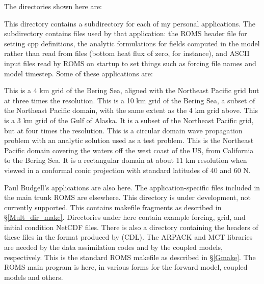 The directories shown here are:
\begin{klist}
   This directory contains a subdirectory for each of my
  personal applications. The subdirectory contains files used by that
  application: the ROMS header file for setting cpp definitions, the
  analytic formulations for fields computed in the model rather than
  read from files (bottom heat flux of zero, for instance), and ASCII
  input files read by ROMS on startup to set things such as forcing file
  names and model timestep. Some of these applications are:
\begin{klist}
   This is a 4 km grid of the Bering Sea, aligned with
  the Northeast Pacific grid but at three times the resolution.
   This is a 10 km grid of the Bering Sea, a
  subset of the Northeast Pacific domain, with the same extent as
  the 4 km grid above.
   This is a 3 km grid of the Gulf of Alaska. It is a
  subset of the Northeast Pacific grid, but at four times the
  resolution.
   This is a circular domain wave propagation problem
  with an analytic solution used as a test problem.
   This is the Northeast Pacific domain covering the
  waters off the west coast of the US, from California to the Bering
  Sea. It is a rectangular domain at about 11 km resolution when
  viewed in a conformal conic projection with standard latitudes of
  40 and 60 N.
\end{klist}
  Paul Budgell's applications are also here. The application-specific
  files included in the main trunk ROMS are elsewhere.
   This directory is under development, not
  currently supported.
   This contains makefile fragments as described in
  \S\ref{Mult_dir_make}.
   Directories under here contain example forcing, grid,
  and initial condition NetCDF files. There is also a directory
  containing the headers of these files in the format produced by
   (CDL).
   The ARPACK and MCT libraries are needed by the data
  assimilation codes and by the coupled models, respectively.
   This is the standard ROMS makefile as described
  in \S\ref{Gmake}.
   The ROMS main program is here, in various forms for
  the forward model, coupled models and others.


\end{klist}
